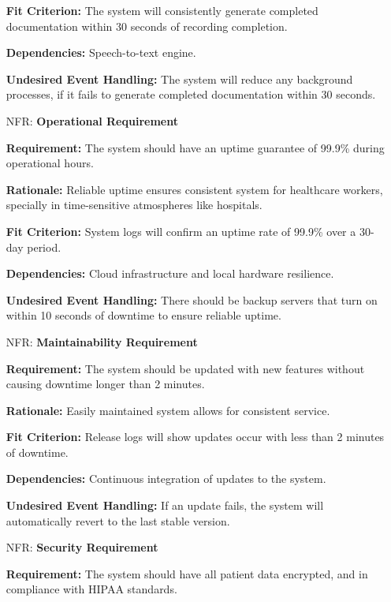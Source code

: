 \documentclass[12pt]{article}
\newcounter{nfrnum} %
\begin{document}
\begin{itemize}
    \textbf{Fit Criterion:} The system will consistently generate completed documentation within 30 seconds of recording completion.  

    \textbf{Dependencies:} Speech-to-text engine.  

    \textbf{Undesired Event Handling:} The system will reduce any background processes, if it fails to generate completed documentation within 30 seconds.

\item[NFR\refstepcounter{nfrnum}\thenfrnum \label{NFR_Operational}:] \textbf{Operational Requirement}

    \textbf{Requirement:} The system should have an uptime guarantee of 99.9\% during operational hours.

    \textbf{Rationale:} Reliable uptime ensures consistent system for healthcare workers, specially in time-sensitive atmospheres like hospitals.

    \textbf{Fit Criterion:} System logs will confirm an uptime rate of 99.9\% over a 30-day period.  

    \textbf{Dependencies:} Cloud infrastructure and local hardware resilience. 
    
    \textbf{Undesired Event Handling:} There should be backup servers that turn on within 10 seconds of downtime to ensure reliable uptime.

\item[NFR\refstepcounter{nfrnum}\thenfrnum \label{NFR_Maintainability}:] \textbf{Maintainability Requirement}

    \textbf{Requirement:} The system should be updated with new features without causing downtime longer than 2 minutes.

    \textbf{Rationale:} Easily maintained system allows for consistent service.

    \textbf{Fit Criterion:} Release logs will show updates occur with less than 2 minutes of downtime.  

    \textbf{Dependencies:} Continuous integration of updates to the system.  

    \textbf{Undesired Event Handling:} If an update fails, the system will automatically revert to the last stable version.

\item[NFR\refstepcounter{nfrnum}\thenfrnum \label{NFR_Security}:] \textbf{Security Requirement}

    \textbf{Requirement:} The system should have all patient data encrypted, and in compliance with HIPAA standards.


\end{itemize}
\end{document}
